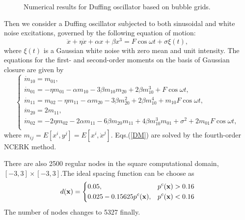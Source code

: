 \documentclass[a4paper, 11pt, final]{article}
\begin{document}
\begin{figure}[htbp]
{\begin{minipage}[top]{160pt}
        \end{minipage}
    }
    \caption{Numerical results for Duffing oscillator based on bubble grids.}
    \label{fig:3}
\end{figure}

Then we consider a Duffing oscillator subjected to both
sinusoidal and white noise excitations, governed by the following
equation of motion:
\begin{equation}\label{D}
\ddot{x}+\eta\dot{x}+\alpha x+\beta x^3=F\cos\omega
t+\sigma\xi(t),
\end{equation}
where $\xi(t)$ is a Gaussian white noise with zero mean and unit intensity.
The equations for the first- and second-order moments on the basis of
Gaussian closure are given by
\begin{equation}\label{DM}
\left\{
\begin{array}{l}
\dot{m}_{10}=m_{01},\\
\dot{m}_{01}=-\eta m_{01}-\alpha m_{10}-3\beta m_{10}m_{20}+2\beta
m_{10}^3+F\cos\omega t,\\
\dot{m}_{11}=m_{02}-\eta m_{11}-\alpha m_{20}-3\beta
m_{20}^2+2\beta
m_{10}^4+m_{10}F\cos\omega t,\\
\dot{m}_{20}=2m_{11},\\
\dot{m}_{02}=-2\eta m_{02}-2\alpha m_{11}-6\beta
m_{20}m_{11}+4\beta m_{10}^3 m_{01}
+\sigma^2+2m_{01}F\cos\omega t,\\
\end{array}\right.
\end{equation}
where $m_{ij}=E[x^i,y^j]=E[x^i,\dot{x}^j]$. Eqs.\;(\ref{DM}) are solved by the fourth-order NCERK method.

There are also 2500 regular nodes in the square computational domain,
$[-3,3]\times[-3,3]$.The ideal spacing function can be choose as
\[d({\bf x}) = \left\{ \begin{aligned}
    &0.05, & p^c({\bf x}) > 0.16\\
    &0.025 - 0.15625p^c({\bf x}), & p^c({\bf x}) < 0.16\\
\end{aligned} \right.\]
The number of nodes changes to 5327 finally.
\end{document}
